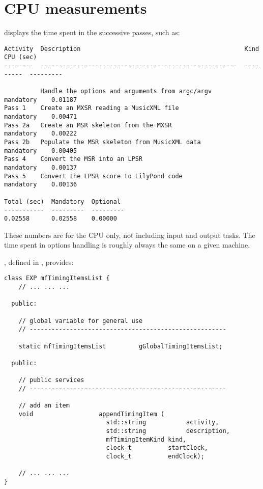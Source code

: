
\chapter{CPU measurements}

 displays the time spent in the successive passes, such as:
\begin{lstlisting}[language=Terminal]
Activity  Description                                             Kind       CPU (sec)
--------  ------------------------------------------------------  ---------  ---------

          Handle the options and arguments from argc/argv         mandatory    0.01187
Pass 1    Create an MXSR reading a MusicXML file              mandatory    0.00471
Pass 2a   Create an MSR skeleton from the MXSR                mandatory    0.00222
Pass 2b   Populate the MSR skeleton from MusicXML data            mandatory    0.00405
Pass 4    Convert the MSR into an LPSR                            mandatory    0.00137
Pass 5    Convert the LPSR score to LilyPond code                 mandatory    0.00136

Total (sec)  Mandatory  Optional
-----------  ---------  ---------
0.02558      0.02558    0.00000
\end{lstlisting}

These numbers are for the CPU only, not including input and output tasks.
The time spent in options handling is roughly always the same on a given machine.

, defined in , provides:
\begin{lstlisting}[language=CPlusPlus]
class EXP mfTimingItemsList {
	// ... ... ...

  public:

    // global variable for general use
    // ------------------------------------------------------

    static mfTimingItemsList         gGlobalTimingItemsList;

  public:

    // public services
    // ------------------------------------------------------

    // add an item
    void                  appendTimingItem (
                            std::string           activity,
                            std::string           description,
                            mfTimingItemKind kind,
                            clock_t          startClock,
                            clock_t          endClock);

	// ... ... ...
}
\end{lstlisting}

